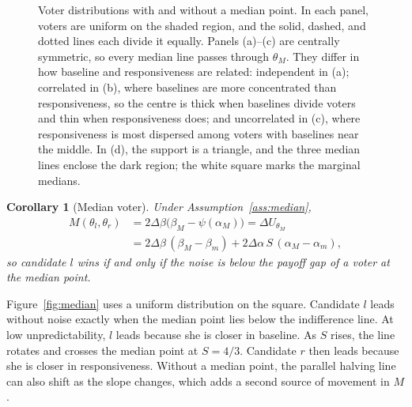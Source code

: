 \documentclass[12pt,letterpaper]{article}
\newtheorem{corollary}{Corollary}
\begin{document}
\begin{figure}[t]
\caption{Voter distributions with and without a median point. In each panel, voters are uniform on the shaded region, and the solid, dashed, and dotted lines each divide it equally. Panels (a)--(c) are centrally symmetric, so every median line passes through $\theta_M$. They differ in how baseline and responsiveness are related: independent in (a); correlated in (b), where baselines are more concentrated than responsiveness, so the centre is thick when baselines divide voters and thin when responsiveness does; and uncorrelated in (c), where responsiveness is most dispersed among voters with baselines near the middle. In (d), the support is a triangle, and the three median lines enclose the dark region; the white square marks the marginal medians.}
\label{fig:median-types}
\end{figure}

\begin{corollary}[Median voter]\label{cor:median}
Under Assumption~\ref{ass:median},
\begin{align*}
M(\theta_l,\theta_r)
&=2\Delta\beta\big(\beta_M-\psi(\alpha_M)\big)=\Delta U_{\theta_M}\\
&=2\Delta\beta\,(\beta_M-\beta_m)+2\Delta\alpha\,S\,(\alpha_M-\alpha_m),
\end{align*}
so candidate $l$ wins if and only if the noise is below the payoff gap of a voter at the median point.
\end{corollary}

Figure~\ref{fig:median} uses a uniform distribution on the square. Candidate $l$ leads without noise exactly when the median point lies below the indifference line. At low unpredictability, $l$ leads because she is closer in baseline. As $S$ rises, the line rotates and crosses the median point at $S=4/3$. Candidate $r$ then leads because she is closer in responsiveness. Without a median point, the parallel halving line can also shift as the slope changes, which adds a second source of movement in $M$.
\end{document}
